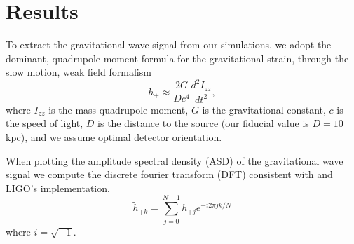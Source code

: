 \documentclass[twocolumn,times]{aastex62}  %
\begin{document}
\section{Results}
\label{sec:results}

To extract the gravitational wave signal from our simulations, we adopt the dominant, quadrupole moment formula for the gravitational strain, through the slow motion, weak field formalism %
\citep[eg.][]{finn:1990,blanchet:1990}
\begin{equation}
    h_+ \approx \frac{2G}{Dc^4}
    \frac{d^2I_{zz}}{dt^2},
\label{eq:quad}
\end{equation}
where $I_{zz}$ is the mass quadrupole moment, $G$ is the gravitational constant, $c$ is the speed of light, $D$ is the distance to the source (our fiducial value is $D=10$ kpc), and we assume optimal detector orientation.\\
\par When plotting the amplitude spectral density (ASD) of the gravitational wave signal we compute the discrete fourier transform (DFT) consistent with \citet{anderson:2004} and LIGO's implementation,
\begin{equation}
\widetilde{h}_{+k} = \sum^{N-1}_{j=0} h_{+j} e^{-i2\pi jk/N}
\label{eq:dft}
\end{equation}
where $i=\sqrt{-1}$.
\end{document}
